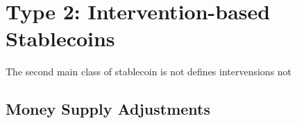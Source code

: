


\section{Type 2: Intervention-based Stablecoins}
\label{sec:t2}

The second main class of stablecoin is not defines intervensions not 






\subsection{Money Supply Adjustments}
\label{sec:elastic}

